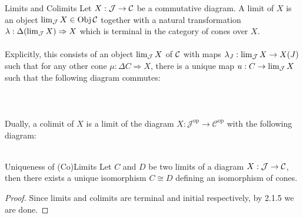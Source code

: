 \documentclass[a4paper]{article}
\begin{document}
\begin{defn}{Limits and Colimits}{} Let $X:\mathcal{J}\to\mathcal{C}$ be a commutative diagram. A limit of $X$ is an object $\lim_{\mathcal{J}} X\in\operatorname{Obj}\mathcal{C}$ together with a natural transformation $\lambda:\Delta(\lim_{\mathcal{J}} X)\Rightarrow X$ which is terminal in the category of cones over $X$. \\~\\
Explicitly, this consists of an object $\lim_{\mathcal{J}} X$ of $\mathcal{C}$ with maps $\lambda_J:\lim_{\mathcal{J}} X\to X(J)$ such that for any other cone $\mu:\Delta C\Rightarrow X$, there is a unique map $u:C\to\lim_{\mathcal{J}} X$ such that the following diagram commutes: \\~\\
\\~\\

Dually, a colimit of $X$ is a limit of the diagram $X:\mathcal{J}^{\text{op}}\to\mathcal{C}^{\text{op}}$ with the following diagram: \\~\\
\end{defn}

\begin{thm}{Uniqueness of (Co)Limits}{} Let $C$ and $D$ be two limits of a diagram $X:\mathcal{J}\to\mathcal{C}$, then there exists a unique isomorphism $C\cong D$ defining an isomorphism of cones. \tcbline
\begin{proof}
Since limits and colimits are terminal and initial respectively, by 2.1.5 we are done. 
\end{proof}
\end{thm}
\end{document}
